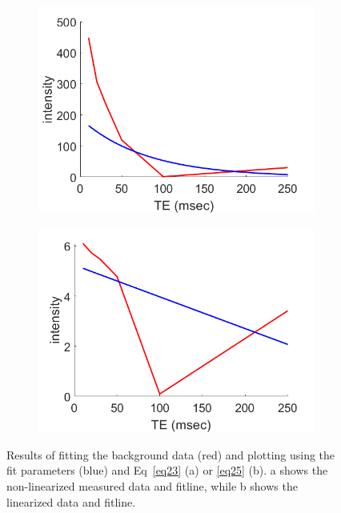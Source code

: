 \documentclass[12pt]{article}
\begin{document}
\begin{figure}[H]
	\begin{subfigure}{.5\textwidth}
		\centering
		\includegraphics[width=.95\linewidth]{bck_nonlin.png}
		\caption{}
		\label{fig:b_nonlin}
	\end{subfigure}%
	\begin{subfigure}{.5\textwidth}
		\centering
		\includegraphics[width=.95\linewidth]{bck_lin.png}
		\caption{}
		\label{fig:b_lin}
	\end{subfigure}
	\caption{Results of fitting the background data (red) and plotting using the fit parameters (blue) and Eq~\ref{eq23} (a) or \ref{eq25} (b). a shows the non-linearized measured data and fitline, while b shows the linearized data and fitline.}
	\label{fig:bckgrnd}
\end{figure}
\end{document}
